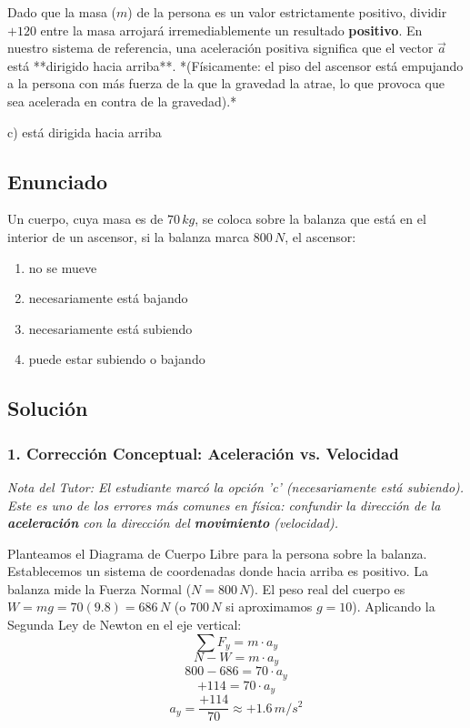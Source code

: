 \documentclass[12pt, a4paper]{article}
\begin{document}
Dado que la masa ($m$) de la persona es un valor estrictamente positivo, dividir $+120$ entre la masa arrojará irremediablemente un resultado \textbf{positivo}. 
En nuestro sistema de referencia, una aceleración positiva significa que el vector $\vec{a}$ está **dirigido hacia arriba**. 
*(Físicamente: el piso del ascensor está empujando a la persona con más fuerza de la que la gravedad la atrae, lo que provoca que sea acelerada en contra de la gravedad).*

\begin{tcolorbox}[colback=green!5!white, colframe=green!50!black, title=Respuesta Final]
\centering \Large c) está dirigida hacia arriba
\end{tcolorbox}

\newpage

\subsection*{Enunciado}
Un cuerpo, cuya masa es de $70\,\si{kg}$, se coloca sobre la balanza que está en el interior de un ascensor, si la balanza marca $800\,\si{N}$, el ascensor:
\begin{enumerate}[label=\alph*)]
    \item no se mueve
    \item necesariamente está bajando
    \item necesariamente está subiendo
    \item puede estar subiendo o bajando
\end{enumerate}

\subsection*{Solución}

\subsubsection*{1. Corrección Conceptual: Aceleración vs. Velocidad}
\textit{Nota del Tutor: El estudiante marcó la opción 'c' (necesariamente está subiendo). Este es uno de los errores más comunes en física: confundir la dirección de la \textbf{aceleración} con la dirección del \textbf{movimiento} (velocidad).}

Planteamos el Diagrama de Cuerpo Libre para la persona sobre la balanza. Establecemos un sistema de coordenadas donde hacia arriba es positivo. 
La balanza mide la Fuerza Normal ($N = 800\,\si{N}$). El peso real del cuerpo es $W = mg = 70(9.8) = 686\,\si{N}$ (o $700\,\si{N}$ si aproximamos $g=10$).
Aplicando la Segunda Ley de Newton en el eje vertical:
$$ \sum F_y = m \cdot a_y $$
$$ N - W = m \cdot a_y $$
$$ 800 - 686 = 70 \cdot a_y $$
$$ +114 = 70 \cdot a_y $$
$$ a_y = \frac{+114}{70} \approx +1.6\,\si{m/s^2} $$
\end{document}
